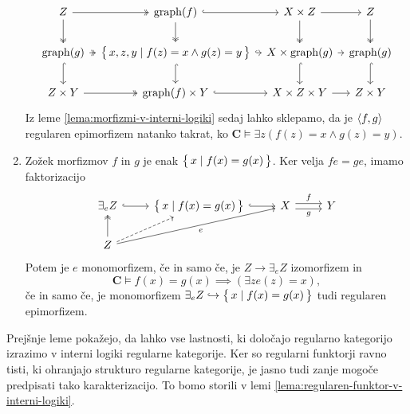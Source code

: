 \documentclass[../kategoricna_logika.tex]{subfiles}
\begin{document}
\begin{dokaz}
\begin{enumerate}[label=(\roman*)]
\begin{equation*}
\begin{tikzcd}[column sep=tiny]
          Z \ar[d, two heads] \ar[r, two heads] & \mathrm{graph}(f)
          \ar[d, two heads] \ar[r, hook] &
          X \times Z \ar[d, two heads] \ar[r] & Z \ar[d, two heads] \\
          \mathrm{graph}(g) \ar[d, hook] \ar[r, two heads] &
          \set{x,z,y \mid f(z) = x \land g(z) = y} \ar[d, hook] \ar[r,
          hook] & X \times \mathrm{graph}(g) \ar[d, hook] \ar[r] &
          \mathrm{graph}(g) \ar[d, hook] \\
          Z \times Y \ar[r, two heads] & \mathrm{graph}(f) \times Y
          \ar[r, hook] & X \times Z \times Y \ar[r] & Z \times Y
        \end{tikzcd}
      \end{equation*}
      Iz leme \ref{lema:morfizmi-v-interni-logiki} sedaj lahko
      sklepamo, da je $\langle f,g \rangle$ regularen epimorfizem natanko
      takrat, ko
      $\mathbf{C} \models \exists z (f(z) = x \land g(z) = y)$.
      
    \item Zožek morfizmov $f$ in $g$ je enak
      $\left\lbrace\,x \mid f(x) = g(x)\,\right\rbrace$.  Ker velja ${f e = g e}$, imamo
      faktorizacijo
      \begin{equation*}
        \begin{tikzcd}
          \exists_{e}Z \ar[r, hook] & \set{x \mid f(x) = g(x)} \ar[r,
          hook] &
          X \ar[r, shift left, "f"] \ar[r, shift right, "g"'] & Y \\
          Z \ar[u, two heads] \ar[ur, dashed] \ar[urr, "e"']
        \end{tikzcd}
      \end{equation*}
      Potem je $e$ monomorfizem, če in samo če, je
      $Z \to \exists_{e}Z$ izomorfizem in
      \[\mathbf{C} \models f(x) = g(x) \implies (\exists z e(z) =
        x),\] če in samo če, je monomorfizem
      $\exists_{e}Z \hookrightarrow \left\lbrace\,x \mid f(x) = g(x)\,\right\rbrace$ tudi
      regularen epimorfizem.
    \end{enumerate}
  \end{dokaz}%
  Prejšnje leme pokažejo, da lahko vse lastnosti, ki določajo
  regularno kategorijo izrazimo v interni logiki regularne kategorije.
  Ker so regularni funktorji ravno tisti, ki ohranjajo strukturo regularne
  kategorije, je jasno tudi zanje mogoče predpisati tako karakterizacijo.
  To bomo storili v lemi \ref{lema:regularen-funktor-v-interni-logiki}.
%
\end{document}
